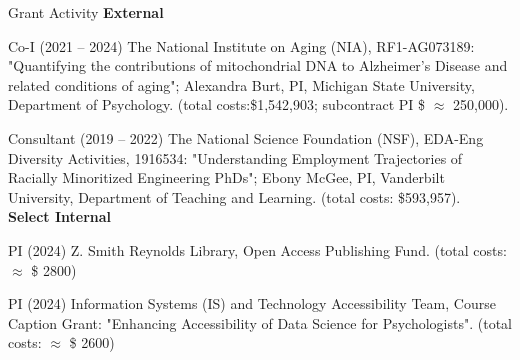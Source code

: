\begin{rSection}{\textrm{Grant Activity}}%
{\large \textbf{External}}%
\begin{etaremune}
\item Co-I (2021 – 2024) The National Institute on Aging (NIA), RF1-AG073189: "Quantifying the contributions of mitochondrial DNA to Alzheimer's Disease and related conditions of aging"; Alexandra Burt, PI, Michigan State University, Department of Psychology. (total costs:\$1,542,903; subcontract PI \$ $\approx$ 250,000).

\item Consultant (2019 – 2022) The National Science Foundation (NSF), EDA-Eng Diversity Activities, 1916534: "Understanding Employment Trajectories of Racially Minoritized Engineering PhDs"; Ebony McGee, PI, Vanderbilt University, Department of Teaching and Learning. (total costs: \$593,957).
\smallskip\\
\hspace*{-8mm}\large{\bf{Select Internal}}%
\item PI (2024) Z. Smith Reynolds Library, Open Access Publishing Fund. (total costs: $\approx$ \$ 2800) %
\item PI (2024) Information Systems (IS) and Technology Accessibility Team, Course Caption Grant: "Enhancing Accessibility of Data Science for Psychologists". (total costs: $\approx$ \$ 2600)%
\end{etaremune}
\end{rSection}